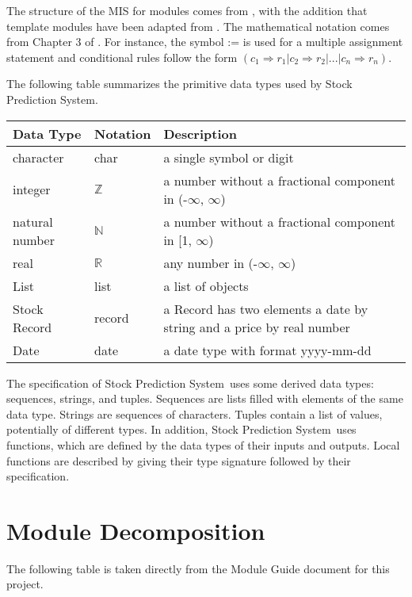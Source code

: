 \documentclass[12pt, titlepage]{article}
\newcommand{\progname}{Stock Prediction System}
\begin{document}
The structure of the MIS for modules comes from \citet{HoffmanAndStrooper1995},
with the addition that template modules have been adapted from
\cite{GhezziEtAl2003}. The mathematical notation comes from Chapter 3 of
\citet{HoffmanAndStrooper1995}. For instance, the symbol := is used for a
multiple assignment statement and conditional rules follow the form $(c_1
\Rightarrow r_1 | c_2 \Rightarrow r_2 | ... | c_n \Rightarrow r_n )$.

The following table summarizes the primitive data types used by \progname. 

\begin{center}
\renewcommand{\arraystretch}{1.2}
\noindent 
\begin{tabular}{l l p{7.5cm}} 
\toprule 
\textbf{Data Type} & \textbf{Notation} & \textbf{Description}\\ 
\midrule
character & char & a single symbol or digit\\
integer & $\mathbb{Z}$ & a number without a fractional component in (-$\infty$, $\infty$) \\
natural number & $\mathbb{N}$ & a number without a fractional component in [1, $\infty$) \\
real & $\mathbb{R}$ & any number in (-$\infty$, $\infty$)\\
List &list & a list of objects\\
Stock Record & record & a Record has two elements a date by string and a price by real number\\
Date &date & a date type with format yyyy-mm-dd\\
\bottomrule
\end{tabular} 
\end{center}

\noindent
The specification of \progname \ uses some derived data types: sequences, strings, and
tuples. Sequences are lists filled with elements of the same data type. Strings
are sequences of characters. Tuples contain a list of values, potentially of
different types. In addition, \progname \ uses functions, which
are defined by the data types of their inputs and outputs. Local functions are
described by giving their type signature followed by their specification.

\section{Module Decomposition}

The following table is taken directly from the Module Guide document for this project.
\end{document}
